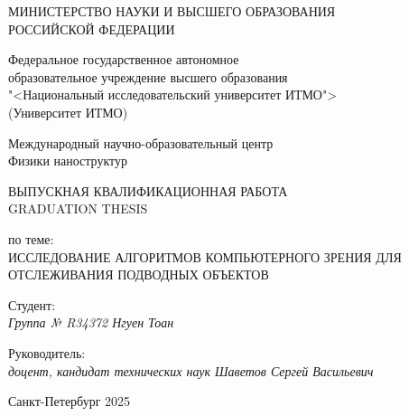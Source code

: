 \thispagestyle{empty}

\begin{center}
    МИНИСТЕРСТВО НАУКИ И ВЫСШЕГО ОБРАЗОВАНИЯ \\ РОССИЙСКОЙ ФЕДЕРАЦИИ

    \vspace{20pt}

    Федеральное государственное автономное \\ образовательное учреждение высшего образования \\
    "<Национальный исследовательский университет ИТМО"> \\
    (Университет ИТМО)

    \vspace{20pt}

    Международный научно-образовательный центр \\ Физики наноструктур
\end{center}

\vfill

\begin{center}
    ВЫПУСКНАЯ КВАЛИФИКАЦИОННАЯ РАБОТА \\  
    GRADUATION THESIS \\

    \vspace{20pt}

    по теме: \\
    \uppercase{Исследование алгоритмов компьютерного зрения для отслеживания подводных объектов}
\end{center}

\vfill

    \noindent Студент: \\
    \textit{Группа № R34372 \hfill Нгуен Тоан}

    \vspace{20pt}

    \noindent Руководитель: \\
    \textit{доцент, кандидат технических наук \hfill Шаветов Сергей Васильевич}

\vfill

\begin{center}
    Санкт-Петербург 2025
\end{center}